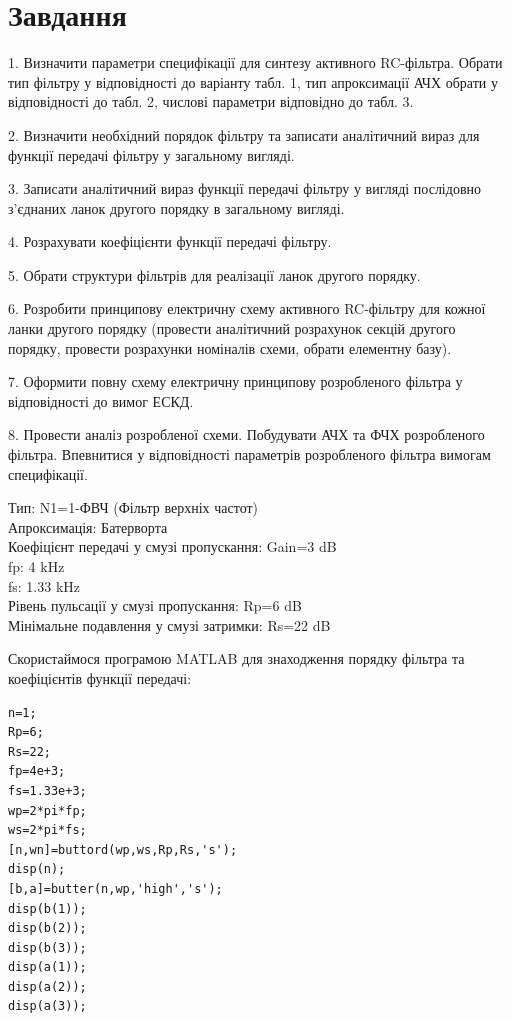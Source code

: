 \documentclass[14pt,a4paper]{scrartcl}
\begin{document}
\section{Завдання}
\begin{trivlist}
\item1. Визначити параметри специфікації для синтезу активного RC-фільтра. Обрати тип
фільтру у відповідності до варіанту табл. 1, тип апроксимації АЧХ обрати у відповідності
до табл. 2, числові параметри відповідно до табл. 3.
\item2. Визначити необхідний порядок фільтру та записати аналітичний вираз для функції
передачі фільтру у загальному вигляді.
\item3. Записати аналітичний вираз функції передачі фільтру у вигляді послідовно з’єднаних
ланок другого порядку в загальному вигляді.
\item4. Розрахувати коефіцієнти функції передачі фільтру.
\item5. Обрати структури фільтрів для реалізації ланок другого порядку.
\item6. Розробити принципову електричну схему активного RC-фільтру для кожної ланки другого
порядку (провести аналітичний розрахунок секцій другого порядку, провести розрахунки
номіналів схеми, обрати елементну базу).
\item7. Оформити повну схему електричну принципову розробленого фільтра у відповідності до
вимог ЕСКД.
\item8. Провести аналіз розробленої схеми. Побудувати АЧХ та ФЧХ розробленого фільтра.
Впевнитися у відповідності параметрів розробленого фільтра вимогам специфікації.
\end{trivlist}
\newpage

Тип: N1=1-ФВЧ (Фільтр верхніх частот)\\

Апроксимація: Батерворта\\

Коефіцієнт передачі у смузі пропускання: Gain=3 dB\\

fp: 4 kHz\\

fs: 1.33 kHz\\

Рівень пульсації у смузі пропускання: Rp=6 dB\\

Мінімальне подавлення у смузі затримки: Rs=22 dB\\
\newpage

Скористаймося програмою MATLAB для знаходження порядку фільтра та коефіцієнтів функції передачі:

\begin{verbatim}
n=1;
Rp=6; 
Rs=22; 
fp=4e+3;
fs=1.33e+3;
wp=2*pi*fp;
ws=2*pi*fs;
[n,wn]=buttord(wp,ws,Rp,Rs,'s');
disp(n);
[b,a]=butter(n,wp,'high','s');
disp(b(1));
disp(b(2));
disp(b(3));
disp(a(1));
disp(a(2));
disp(a(3));
\end{verbatim}
\end{document}
